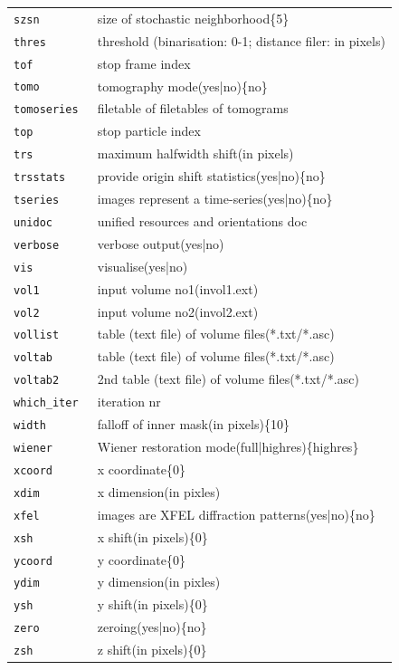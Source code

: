\documentclass[a4paper,11pt]{article}
\begin{document}
\begin{tabular}{ll}
\texttt{szsn            }&{ size of stochastic neighborhood\{5\}}\\
\texttt{thres           }&{ threshold (binarisation: 0-1; distance filer: in pixels)}\\
\texttt{tof             }&{ stop frame index}\\
\texttt{tomo            }&{ tomography mode(yes|no)\{no\}}\\
\texttt{tomoseries      }&{ filetable of filetables of tomograms}\\
\texttt{top             }&{ stop particle index}\\
\texttt{trs             }&{ maximum halfwidth shift(in pixels)}\\
\texttt{trsstats        }&{ provide origin shift statistics(yes|no)\{no\}}\\
\texttt{tseries         }&{ images represent a time-series(yes|no)\{no\}}\\
\texttt{unidoc          }&{ unified resources and orientations doc}\\
\texttt{verbose         }&{ verbose output(yes|no)}\\
\texttt{vis             }&{ visualise(yes|no)}\\
\texttt{vol1            }&{ input volume no1(invol1.ext)}\\
\texttt{vol2            }&{ input volume no2(invol2.ext)}\\
\texttt{vollist         }&{ table (text file) of volume files(*.txt/*.asc)}\\
\texttt{voltab          }&{ table (text file) of volume files(*.txt/*.asc)}\\
\texttt{voltab2         }&{ 2nd table (text file) of volume files(*.txt/*.asc)}\\
\texttt{which\_iter      }&{ iteration nr}\\
\texttt{width           }&{ falloff of inner mask(in pixels)\{10\}}\\
\texttt{wiener          }&{ Wiener restoration mode(full|highres)\{highres\}}\\
\texttt{xcoord          }&{ x coordinate\{0\}}\\
\texttt{xdim            }&{ x dimension(in pixles)}\\
\texttt{xfel            }&{ images are XFEL diffraction patterns(yes|no)\{no\}}\\
\texttt{xsh             }&{ x shift(in pixels)\{0\}}\\
\texttt{ycoord          }&{ y coordinate\{0\}}\\
\texttt{ydim            }&{ y dimension(in pixles)}\\
\texttt{ysh             }&{ y shift(in pixels)\{0\}}\\
\texttt{zero            }&{ zeroing(yes|no)\{no\}}\\
\texttt{zsh             }&{ z shift(in pixels)\{0\}}\\
\end{tabular}
\end{document}
